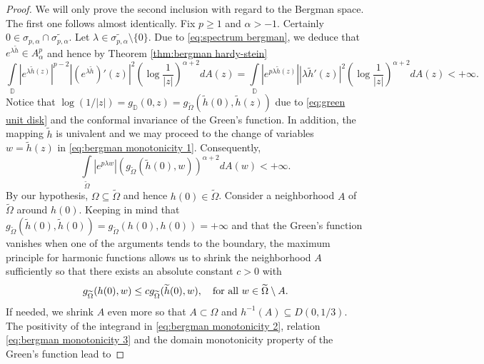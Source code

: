 \documentclass[11pt]{amsart}
\numberwithin{equation}{section}
\theoremstyle{definition}
\DeclareMathOperator{\D}{\mathbb{D}}
\begin{document}
	\begin{proof}
		We will only prove the second inclusion with regard to the Bergman space. The first one follows almost identically. Fix $p\ge1$ and $\alpha>-1$. Certainly $0\in\sigma_{p,\alpha}\cap\widetilde{\sigma_{p,\alpha}}$. Let $\lambda\in\widetilde{\sigma_{p,\alpha}}\setminus\{0\}$. Due to \eqref{eq:spectrum bergman}, we deduce that $e^{\lambda\widetilde{h}}\in A_\alpha^p$ and hence by Theorem \ref{thm:bergman hardy-stein}
		\begin{equation}\label{eq:bergman monotonicity 1}
			\int\limits_{\D}\left|e^{\lambda \widetilde{h}(z)}\right|^{p-2}\left|\left(e^{\lambda\widetilde{h}}\right)'(z)\right|^{2}\left(\log\frac{1}{|z|}\right)^{\alpha+2}dA(z)=\int\limits_{\D}\left|e^{p\lambda\widetilde{h}(z)}\right||\lambda \widetilde{h}'(z)|^2\left(\log\frac{1}{|z|}\right)^{\alpha+2}dA(z)<+\infty.
		\end{equation} 
		Notice that $\log(1/|z|)=g_{\D}(0,z)=g_{\widetilde{\Omega}}(\widetilde{h}(0),\widetilde{h}(z))$ due to \eqref{eq:green unit disk} and the conformal invariance of the Green's function. In addition, the mapping $\widetilde{h}$ is univalent and we may proceed to the change of variables $w=\widetilde{h}(z)$ in \eqref{eq:bergman monotonicity 1}. Consequently,
		\begin{equation}\label{eq:bergman monotonicity 2}
			\int\limits_{\widetilde{\Omega}}\left|e^{p\lambda w}\right|(g_{\widetilde{\Omega}}(\widetilde{h}(0),w))^{\alpha+2}dA(w)<+\infty.
		\end{equation}
		By our hypothesis, $\Omega\subseteq\widetilde{\Omega}$ and hence $h(0)\in\widetilde{\Omega}$. Consider a neighborhood $A$ of $\widetilde{\Omega}$ around $h(0)$. Keeping in mind that $g_{\widetilde{\Omega}}(\widetilde{h}(0),\widetilde{h}(0))=g_{\widetilde{\Omega}}(h(0),h(0))=+\infty$ and that the Green's function vanishes when one of the arguments tends to the boundary, the maximum principle for harmonic functions allows us to shrink the neighborhood $A$ sufficiently so that there exists an absolute constant $c>0$ with
		\begin{equation}\label{eq:bergman monotonicity 3}
			g_{\widetilde{\Omega}}(h(0),w) \le c g_{\widetilde{\Omega}}(\widetilde{h}(0),w), \quad \textup{for all }w\in\widetilde{\Omega}\setminus A.
		\end{equation}
		If needed, we shrink $A$ even more so that $A\subset\Omega$ and $h^{-1}(A)\subseteq D(0,1/3)$. The positivity of the integrand in \eqref{eq:bergman monotonicity 2}, relation \eqref{eq:bergman monotonicity 3} and the domain monotonicity property of the Green's function lead to

\end{proof}
\end{document}
